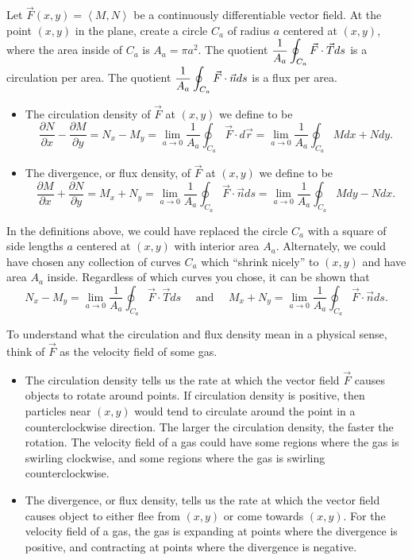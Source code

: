 \begin{definition}\label{definition of flux density in 2D}
Let $\vec F(x,y)=\left<M,N\right>$ be a continuously differentiable vector field. 
  At the point $(x,y)$ in the plane, create a circle $C_a$ of radius $a$ centered at $(x,y)$, where the area inside of $C_a$ is $A_a=\pi a^2$. The quotient $\displaystyle \frac{1}{A_a}\oint_{C_a} \vec F \cdot \vec T ds$ is a circulation per area.  The quotient $\displaystyle \frac{1}{A_a}\oint_{C_a} \vec F \cdot \vec n ds$ is a flux per area.
\begin{itemize}
 \item {}%
The circulation density of $\vec F$ at $(x,y)$ we define to be 
$$\frac{\partial N}{\partial x}-\frac{\partial M}{\partial y}=N_x-M_y = \lim_{a\to 0} \frac{1}{A_a}\oint_{C_a} \vec F \cdot  d\vec r = 
\lim_{a\to 0} \frac{1}{A_a}\oint_{C_a} Mdx+Ndy.$$ 
 \item The divergence, or flux density, of $\vec F$ at $(x,y)$ we define to be 
$$\frac{\partial M}{\partial x}+\frac{\partial N}{\partial y}=M_x+N_y=\lim_{a\to 0} \frac{1}{A_a}\oint_{C_a} \vec F \cdot \vec n ds = 
\lim_{a\to 0} \frac{1}{A_a}\oint_{C_a} Mdy-Ndx.$$
\end{itemize}
\end{definition}

In the definitions above, we could have replaced the circle $C_a$ with a square of side lengths $a$ centered at $(x,y)$ with interior area $A_a$. Alternately, we could have chosen any collection of curves $C_a$ which ``shrink nicely'' to $(x,y)$ and have area $A_a$ inside. Regardless of which curves you chose, it can be shown that 
$$N_x-M_y=\lim_{a\to 0} \frac{1}{A_a}\oint_{C_a} \vec F \cdot \vec T ds \quad \text{ and } \quad M_x+N_y=\lim_{a\to 0} \frac{1}{A_a}\oint_{C_a} \vec F \cdot \vec n ds.$$

To understand what the circulation and flux density mean in a physical sense, think of $\vec F$ as the velocity field of some gas.  
\begin{itemize}
 \item The circulation density tells us the rate at which the vector field $\vec F$ causes objects to rotate around points.  If circulation density is positive, then particles near $(x,y)$ would tend to circulate around the point in a counterclockwise direction. The larger the circulation density, the faster the rotation. The velocity field of a gas could have some regions where the gas is swirling clockwise, and some regions where the gas is swirling counterclockwise.
 \item The divergence, or flux density, tells us the rate at which the vector field causes object to either flee from $(x,y)$ or come towards $(x,y)$. For the velocity field of a gas, the gas is expanding at points where the divergence is positive, and contracting at points where the divergence is negative. 
\end{itemize}


